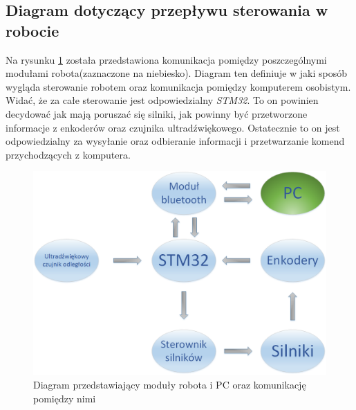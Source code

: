 \documentclass[a4paper]{article}
\begin{document}
\subsection{Diagram dotyczący przepływu sterowania w robocie}
Na rysunku \ref{moduly_robota_pc} została przedstawiona komunikacja pomiędzy poszczególnymi modułami robota(zaznaczone na niebiesko). Diagram ten definiuje w jaki sposób wygląda sterowanie robotem oraz komunikacja pomiędzy komputerem osobistym. Widać, że za całe sterowanie jest odpowiedzialny \textit{STM32}. To on powinien decydować jak mają poruszać się silniki, jak powinny być przetworzone informacje z enkoderów oraz czujnika ultradźwiękowego. Ostatecznie to on jest odpowiedzialny za wysyłanie oraz odbieranie informacji i przetwarzanie komend przychodzących z komputera. 
\begin{figure}[H]
\centering
\includegraphics[width=\linewidth]{diagram_komunikacji_modulow_img}
\caption{Diagram przedstawiający moduły robota i PC oraz komunikację pomiędzy nimi}
\label{moduly_robota_pc}
\end{figure}
\end{document}
